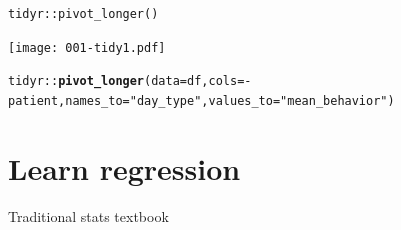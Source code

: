 \documentclass[10pt,handout]{beamer}\usepackage[]{graphicx}\usepackage[]{color}
\makeatletter
\newcommand{\hlstr}[1]{\textcolor[rgb]{0.192,0.494,0.8}{#1}}%
\newcommand{\hlopt}[1]{\textcolor[rgb]{0,0,0}{#1}}%
\newcommand{\hlstd}[1]{\textcolor[rgb]{0.345,0.345,0.345}{#1}}%
\newcommand{\hlkwc}[1]{\textcolor[rgb]{0.333,0.667,0.333}{#1}}%
\newcommand{\hlkwd}[1]{\textcolor[rgb]{0.737,0.353,0.396}{\textbf{#1}}}%
\newenvironment{kframe}{%
 \def\at@end@of@kframe{}%
 \ifinner\ifhmode%
  \def\at@end@of@kframe{\end{minipage}}%
  \begin{minipage}{\columnwidth}%
 \fi\fi%
 \def\FrameCommand##1{\hskip\@totalleftmargin \hskip-\fboxsep
 \colorbox{shadecolor}{##1}\hskip-\fboxsep
     \hskip-\linewidth \hskip-\@totalleftmargin \hskip\columnwidth}%
 \MakeFramed {\advance\hsize-\width
   \@totalleftmargin\z@ \linewidth\hsize
   \@setminipage}}%
 {\par\unskip\endMakeFramed%
 \at@end@of@kframe}
\newenvironment{knitrout}{}{} %
\makeatother
\begin{document}
\begin{frame}[fragile]{\texttt{tidyr::pivot\_longer()}}
	
	
	
	\texttt{[image: 001-tidy1.pdf]}
	
	
\begin{knitrout}\tiny
{}\color{fgcolor}\begin{kframe}
\begin{alltt}
\hlstd{tidyr}\hlopt{::}\hlkwd{pivot_longer}\hlstd{(}\hlkwc{data} \hlstd{= df,} \hlkwc{cols} \hlstd{=} \hlopt{-}\hlstd{patient,} \hlkwc{names_to} \hlstd{=} \hlstr{"day_type"}\hlstd{,} \hlkwc{values_to} \hlstd{=} \hlstr{"mean_behavior"}\hlstd{)}
\end{alltt}
\end{kframe}
\end{knitrout}
	
	
\end{frame}



\section{Learn regression}


\begin{frame}{Traditional stats textbook}
\end{frame}
\end{document}
